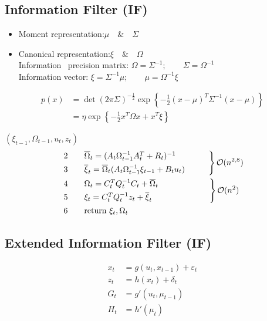 \subsection{Information Filter (IF)}
\begin{itemize}
	\item Moment representation:\tab\tab $\mu \quad\&\quad \Sigma$
	\item Canonical representation:\tab\tab $\xi \quad\&\quad \Omega$\\
	Information \ precision matrix: \tab $\Omega = \Sigma^{-1};\qquad \Sigma = \Omega^{-1}$\\
	Information vector: \tab \tab \tab $\xi = \Sigma^{-1}\mu;\qquad \mu = \Omega^{-1}\xi$
\end{itemize}
\begin{align*}
	p(x) &= \det(2\pi\Sigma)^{-\frac{1}{2}} \exp \left\{-\frac{1}{2} (x-\mu)^T \Sigma^{-1} (x-\mu) \right\}\\
	&= \eta \exp\left\{ -\frac{1}{2} x^T\Omega x + x^T \xi \right\}
\end{align*}

 $(\xi_{t-1}, \Omega_{t-1}, u_t, z_t)$
\begin{align*}
	&\begin{rcases}
		2 \qquad \overline{\Omega}_t = (A_t \Omega_{t-1}^{-1} A_t^T + R_t)^{-1} \qquad\qquad\\
		3 \qquad \overline{\xi}_t = \overline{\Omega}_t ( A_t \Omega_{t-1}^{-1} \xi_{t-1} + B_t u_t )
	\end{rcases} \mathcal{O}(n^{2,8})\\
	&\begin{rcases}
		4 \qquad \Omega_t = C_t^T Q_t^{-1} C_t + \overline{\Omega}_t\\
		5 \qquad \xi_t = C_t^T Q_t^{-1} z_t + \overline{\xi}_t \qquad\qquad\qquad\quad
	\end{rcases} \mathcal{O}(n^2)\\
	&\;6 \qquad \text{return } \xi_t, \Omega_t
\end{align*}

\subsection{Extended Information Filter (IF)}
\begin{align*}
	x_t &= g(u_t, x_{t-1}) + \varepsilon_t\\
	z_t &= h(x_t) + \delta_t\\
	G_t &= g'(u_t, \mu_{t-1})\\
	H_t &= h'(\mu_t)
\end{align*}

